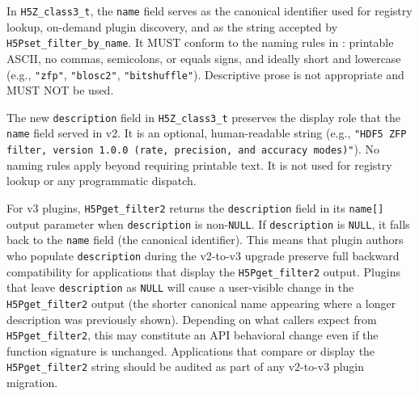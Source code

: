 \documentclass[../HDF5_RFC.tex]{subfiles}
\begin{document}
In \texttt{H5Z\_class3\_t}, the \texttt{name} field serves as the canonical identifier
used for registry lookup, on-demand plugin discovery, and as the string
accepted by \texttt{H5Pset\_filter\_by\_name}. It MUST conform to the naming rules in
: printable ASCII, no commas, semicolons, or equals
signs, and ideally short and lowercase (e.g., \texttt{"zfp"}, \texttt{"blosc2"},
\texttt{"bitshuffle"}). Descriptive prose is not appropriate and MUST NOT be used.

The new \texttt{description} field in \texttt{H5Z\_class3\_t} preserves the display role
that the \texttt{name} field served in v2. It is an optional, human-readable string
(e.g., \texttt{"HDF5 ZFP filter, version 1.0.0 (rate, precision, and accuracy
modes)"}). No naming rules apply beyond requiring printable text. It is not
used for registry lookup or any programmatic dispatch.

For v3 plugins, \texttt{H5Pget\_filter2} returns the \texttt{description} field in
its \texttt{name[]} output parameter when \texttt{description} is non-\texttt{NULL}.
If \texttt{description} is \texttt{NULL}, it falls back to the \texttt{name} field (the
canonical identifier). This means that plugin authors who populate
\texttt{description} during the v2-to-v3 upgrade preserve full backward
compatibility for applications that display the \texttt{H5Pget\_filter2} output.
Plugins that leave \texttt{description} as \texttt{NULL} will cause a
user-visible change in the \texttt{H5Pget\_filter2} output (the shorter canonical
name appearing where a longer description was previously shown). Depending on
what callers expect from \texttt{H5Pget\_filter2}, this may constitute an API
behavioral change even if the function signature is unchanged. Applications
that compare or display the \texttt{H5Pget\_filter2} string should be audited as
part of any v2-to-v3 plugin migration.

\end{document}
